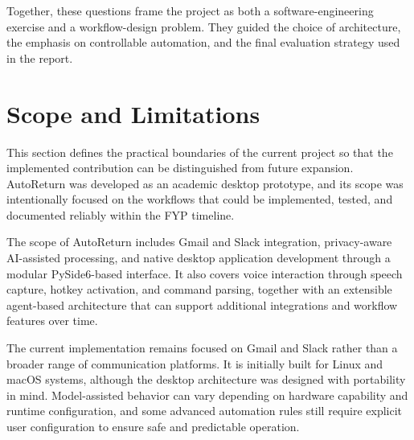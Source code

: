Together, these questions frame the project as both a software-engineering exercise and a workflow-design problem. They guided the choice of architecture, the emphasis on controllable automation, and the final evaluation strategy used in the report.

\section{Scope and Limitations}
This section defines the practical boundaries of the current project so that the implemented contribution can be distinguished from future expansion. AutoReturn was developed as an academic desktop prototype, and its scope was intentionally focused on the workflows that could be implemented, tested, and documented reliably within the FYP timeline.

The scope of AutoReturn includes Gmail and Slack integration, privacy-aware AI-assisted processing, and native desktop application development through a modular PySide6-based interface. It also covers voice interaction through speech capture, hotkey activation, and command parsing, together with an extensible agent-based architecture that can support additional integrations and workflow features over time.

The current implementation remains focused on Gmail and Slack rather than a broader range of communication platforms. It is initially built for Linux and macOS systems, although the desktop architecture was designed with portability in mind. Model-assisted behavior can vary depending on hardware capability and runtime configuration, and some advanced automation rules still require explicit user configuration to ensure safe and predictable operation.
